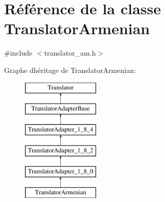\hypertarget{class_translator_armenian}{}\section{Référence de la classe Translator\+Armenian}
\label{class_translator_armenian}


{\ttfamily \#include $<$translator\+\_\+am.\+h$>$}

Graphe d\textquotesingle{}héritage de Translator\+Armenian\+:\begin{figure}[H]
\begin{center}
\leavevmode
\includegraphics[height=6.000000cm]{class_translator_armenian}
\end{center}
\end{figure}
